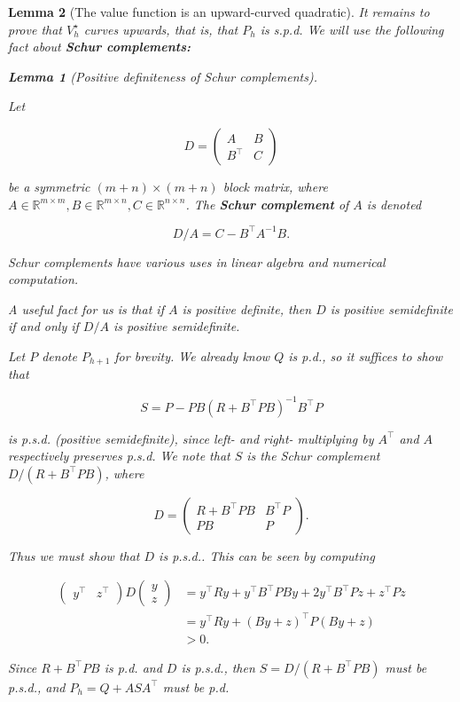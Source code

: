 \documentclass[
  letterpaper,
  DIV=11,
  numbers=noendperiod]{scrreprt}
\theoremstyle{plain}
\newtheorem{lemma}{Lemma}[chapter]
\theoremstyle{plain}
\theoremstyle{definition}
\theoremstyle{definition}
\theoremstyle{remark}
\begin{document}
\begin{lemma}[The value function is an upward-curved
quadratic]
It remains to prove that \(V^\star_h\) \emph{curves upwards,} that is,
that \(P_h\) is s.p.d. We will use the following fact about
\textbf{Schur complements:}

\begin{lemma}[Positive definiteness of Schur
complements]\protect\hypertarget{lem-lemma_schur}{}\label{lem-lemma_schur}

Let

\[
D = \begin{pmatrix}
A & B \\
B^\top & C
\end{pmatrix}
\]

be a symmetric \((m+n) \times (m+n)\) block matrix, where
\(A \in \mathbb{R}^{m \times m}, B \in \mathbb{R}^{m \times n}, C \in \mathbb{R}^{n \times n}\).
The \textbf{Schur complement} of \(A\) is denoted

\[
D/A = C - B^\top A^{-1} B.
\]

Schur complements have various uses in linear algebra and numerical
computation.

A useful fact for us is that if \(A\) is positive \emph{definite,} then
\(D\) is positive \emph{semidefinite} if and only if \(D/A\) is positive
\emph{semidefinite}.

\end{lemma}

Let \(P\) denote \(P_{h+ 1}\) for brevity. We already know \(Q\) is
p.d., so it suffices to show that

\[
S = P - P B (R + B^\top P B)^{-1} B^\top P
\]

is p.s.d. (positive semidefinite), since left- and right- multiplying by
\(A^\top\) and \(A\) respectively preserves p.s.d. We note that \(S\) is
the Schur complement \(D/(R + B^\top P B)\), where

\[
D = \begin{pmatrix}
R + B^\top P B & B^\top P \\
P B & P
\end{pmatrix}.
\]

Thus we must show that \(D\) is p.s.d.. This can be seen by computing

\[
\begin{aligned}
\begin{pmatrix}
y^\top & z^\top
\end{pmatrix}
D
\begin{pmatrix}
y \\ z
\end{pmatrix}
&= y^\top R y + y^\top B^\top P B y + 2 y^\top B^\top P z + z^\top P z \\
&= y^\top R y + (By + z)^\top P (By + z) \\
&> 0.
\end{aligned}
\]

Since \(R + B^\top P B\) is p.d. and \(D\) is p.s.d., then
\(S = D / (R + B^\top P B)\) must be p.s.d., and \(P_h= Q + A S A^\top\)
must be p.d.

\end{lemma}
\end{document}
